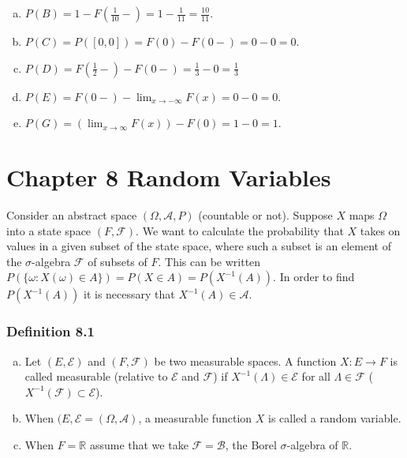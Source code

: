 \documentclass{article}
\begin{document}
{\begin{enumerate}[a)]
\item $P(B) = 1- F\left(\frac{1}{10}-\right) = 1 - \frac{1}{11} = \frac{10}{11}$.

\item $P(C) = P([0,0]) = F(0) - F(0-) = 0 - 0 = 0$.

\item $P(D) = F\left(\frac{1}{2}-\right) - F(0-) = \frac{1}{3} - 0 = \frac{1}{3}$ 

\item $P(E) = F(0-) - \lim_{x\rightarrow - \infty} F(x) = 0 - 0 = 0$.

\item $P(G) = (\lim_{x\rightarrow \infty} F(x)) - F(0) = 1-0 = 1$.
\end{enumerate}

\newpage
\section*{Chapter 8 Random Variables}

Consider an abstract space $(\Omega, \mathcal{A}, P)$ (countable or not). Suppose $X$ maps $\Omega$ into a state space $(F, \mathcal{F})$. We want to calculate the probability that $X$ takes on values in a given subset of the state space, where such a subset is an element of the $\sigma$-algebra $\mathcal{F}$ of subsets of $F$. This can be written $P(\{\omega : X(\omega) \in A\}) = P(X \in A) = P(X^{-1}(A))$. In order to find $P(X^{-1}(A))$ it is necessary that $X^{-1}(A) \in \mathcal{A}$.

\subsubsection*{Definition 8.1}

\begin{enumerate}[a)]
\item Let $(E, \mathcal{E})$ and $(F, \mathcal{F})$ be two measurable spaces. A function $X : E \rightarrow F$ is called measurable (relative to $\mathcal{E}$ and $\mathcal{F}$) if $X^{-1}(\Lambda) \in \mathcal{E}$ for all $\Lambda \in \mathcal{F}$ ($X^{-1}(\mathcal{F}) \subset \mathcal{E}$).

\item When $(E, \mathcal{E} = (\Omega, \mathcal{A})$, a measurable function $X$ is called a random variable. 

\item When $F = \mathbb{R}$ assume that we take $\mathcal{F} = \mathcal{B}$, the Borel $\sigma$-algebra of $\mathbb{R}$.
\end{enumerate} 

}
\end{document}
